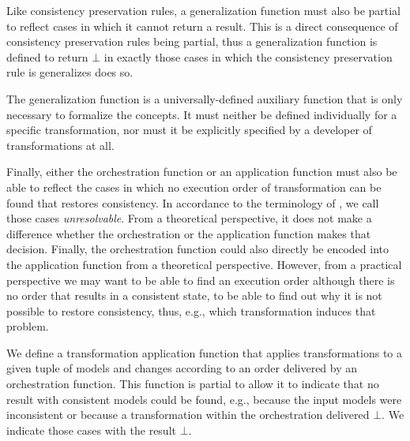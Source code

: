 
Like consistency preservation rules, a generalization function must also be partial to reflect cases in which it cannot return a result.
This is a direct consequence of consistency preservation rules being partial, thus a generalization function is defined to return $\bot$ in exactly those cases in which the consistency preservation rule is generalizes does so.

The generalization function is a universally-defined auxiliary function that is only necessary to formalize the concepts.
It must neither be defined individually for a specific transformation, nor must it be explicitly specified by a developer of transformations at all.

Finally, either the orchestration function or an application function must also be able to reflect the cases in which no execution order of transformation can be found that restores consistency.
In accordance to the terminology of \textcite{stevens2020BidirectionalTransformationLarge-SoSym}, we call those cases \emph{unresolvable}.
From a theoretical perspective, it does not make a difference whether the orchestration or the application function makes that decision. 
Finally, the orchestration function could also directly be encoded into the application function from a theoretical perspective.
However, from a practical perspective we may want to be able to find an execution order although there is no order that results in a consistent state, to be able to find out why it is not possible to restore consistency, thus, e.g., which transformation induces that problem.

We define a transformation application function that applies transformations to a given tuple of models and changes according to an order delivered by an orchestration function.
This function is partial to allow it to indicate that no result with consistent models could be found, e.g., because the input models were inconsistent or because a transformation within the orchestration delivered $\bot$.
We indicate those cases with the result $\bot$.

